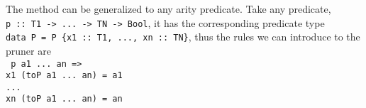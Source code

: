 The method can be generalized to any arity predicate.
Take any predicate,\\\texttt{p :: T1 -> ... -> TN -> Bool},
it has the corresponding predicate type
\\\texttt{data P = P \{x1 :: T1, ..., xn :: TN\}},
thus the rules we can introduce to the pruner are
\\\texttt{
p a1 ... an =>\\
x1 (toP a1 ... an) = a1\\
...\\
xn (toP a1 ... an) = an\\
}
